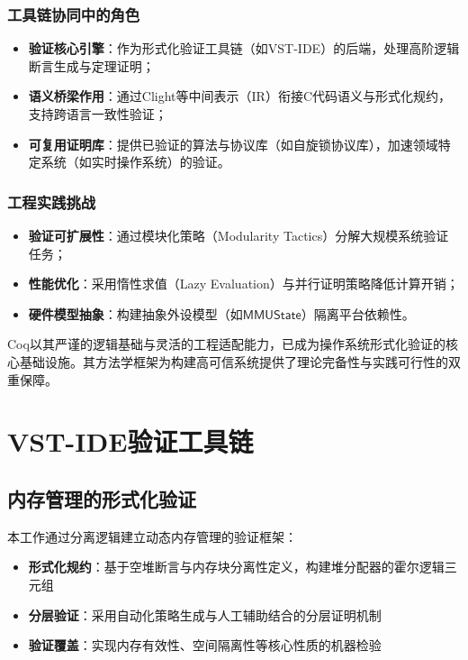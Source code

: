 \subsubsection{工具链协同中的角色}
\begin{itemize}
    \item \textbf{验证核心引擎}：作为形式化验证工具链（如VST-IDE）的后端，处理高阶逻辑断言生成与定理证明；
    \item \textbf{语义桥梁作用}：通过Clight等中间表示（IR）衔接C代码语义与形式化规约，支持跨语言一致性验证；
    \item \textbf{可复用证明库}：提供已验证的算法与协议库（如自旋锁协议库），加速领域特定系统（如实时操作系统）的验证。
\end{itemize}

\subsubsection{工程实践挑战}
\begin{itemize}
    \item \textbf{验证可扩展性}：通过模块化策略（Modularity Tactics）分解大规模系统验证任务；
    \item \textbf{性能优化}：采用惰性求值（Lazy Evaluation）与并行证明策略降低计算开销；
    \item \textbf{硬件模型抽象}：构建抽象外设模型（如$\mathsf{MMUState}$）隔离平台依赖性。
\end{itemize}

Coq以其严谨的逻辑基础与灵活的工程适配能力，已成为操作系统形式化验证的核心基础设施。其方法学框架为构建高可信系统提供了理论完备性与实践可行性的双重保障。

\section{VST-IDE验证工具链}
\label{sec:vst-ide}

\subsection{内存管理的形式化验证}
\label{subsec:mem-verification}

本工作通过分离逻辑建立动态内存管理的验证框架：
\begin{itemize}
    \item \textbf{形式化规约}：基于空堆断言与内存块分离性定义，构建堆分配器的霍尔逻辑三元组
    \item \textbf{分层验证}：采用自动化策略生成与人工辅助结合的分层证明机制
    \item \textbf{验证覆盖}：实现内存有效性、空间隔离性等核心性质的机器检验
\end{itemize}

